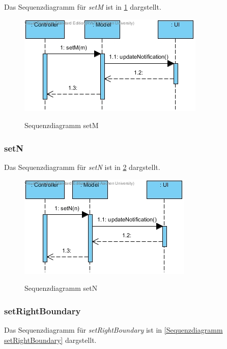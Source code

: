 Das Sequenzdiagramm für \emph{setM} ist in \ref{Sequenzdiagramm setM} dargstellt.

\begin{figure}[H]
	\centering
	\includegraphics[scale=.6]{Bilder/Model__setM().jpg}\\
	\caption{Sequenzdiagramm setM}
	\label{Sequenzdiagramm setM}
\end{figure}

\subsubsection*{setN}

Das Sequenzdiagramm für \emph{setN} ist in \ref{Sequenzdiagramm setN} dargstellt.

\begin{figure}[H]
	\centering
	\includegraphics[scale=.6]{Bilder/Model__setN().jpg}\\
	\caption{Sequenzdiagramm setN}
	\label{Sequenzdiagramm setN}
\end{figure}

\subsubsection*{setRightBoundary}

Das Sequenzdiagramm für \emph{setRightBoundary} ist in \ref{Sequenzdiagramm setRightBoundary} dargstellt.


